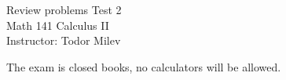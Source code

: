 \documentclass{article}
\begin{document}
\begin{center}
\Large
Review problems Test 2\\ Math 141 Calculus II \\ \normalsize Instructor: Todor Milev
\end{center}


\noindent The exam is closed books, no calculators will be allowed.

\begin{enumerate}

\end{enumerate}
\end{document}
